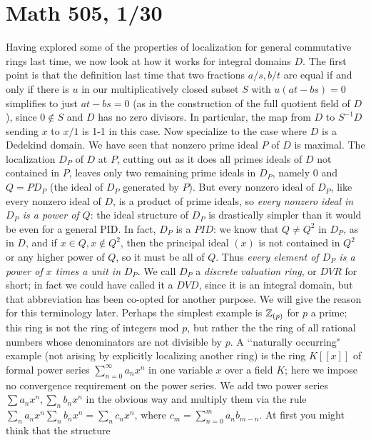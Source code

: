 \documentclass[10pt]{article}
\begin{document}
\section*{Math 505, 1/30}

Having explored some of the properties of localization for general
commutative rings last time, we now look at how it works for integral
domains $D$. The first point is that the definition last time that two
fractions $a/s,b/t$ are equal if and only if there is $u$ in our
multiplicatively closed subset $S$ with $u(at - bs) = 0$ simplifies to
just $at - bs = 0$ (as in the construction of the full quotient field of
$D$), since $0\notin S$ and $D$ has no zero divisors. In particular, the
map from $D$ to $S^{-1}D$ sending $x$ to $x/1$ is 1-1 in this case. Now
specialize to the case where $D$ is a Dedekind domain. We have seen that
nonzero prime ideal $P$ of $D$ is maximal. The localization $D_P$ of $D$
at $P$, cutting out as it does all primes ideals of $D$ not contained in
$P$, leaves only two remaining prime ideals in $D_P$, namely 0 and
$Q=PD_P$ (the ideal of $D_P$ generated by $P$). But every nonzero ideal
of $D_P$, like every nonzero ideal of $D$, is a product of prime ideals,
so {\sl every nonzero ideal in $D_P$ is a power of $Q$}: the ideal
structure of $D_P$ is drastically simpler than it would be even for a
general PID. In fact, $D_P$ is a $PID$: we know that $Q\ne Q^2$ in
$D_P$, as in $D$, and if $x\in Q,x\notin Q^2$, then the principal ideal
$(x)$ is not contained in $Q^2$ or any higher power of $Q$, so it must
be all of $Q$. Thus {\sl every element of $D_P$ is a power of $x$ times
  a unit in $D_P$}. We call $D_P$ a {\sl discrete valuation ring}, or
$DVR$ for short; in fact we could have called it a $DVD$, since it is an
integral domain, but that abbreviation has been co-opted for another
purpose. We will give the reason for this terminology later. Perhaps the
simplest example is $\Bbb Z_{(p)}$ for $p$ a prime; this ring is not the
ring of integers mod $p$, but rather the the ring of all rational
numbers whose denominators are not divisible by $p$. A \lq\lq naturally
occurring" example (not arising by explicitly localizing another ring)
is the ring $K[[x]]$ of formal power series $\sum_{n=0}^\infty a_n x^n$
in one variable $x$ over a field $K$; here we impose no convergence
requirement on the power series. We add two power series $\sum a_n x^n,
\sum_n b_n x^n$ in the obvious way and multiply them via the rule
$\sum_n a_n x^n \sum_n b_n x^n = \sum_n c_n x^n$, where $c_m =
\sum_{n=0}^m a_n b_{m-n}$. At first you might think that the structure
\end{document}
